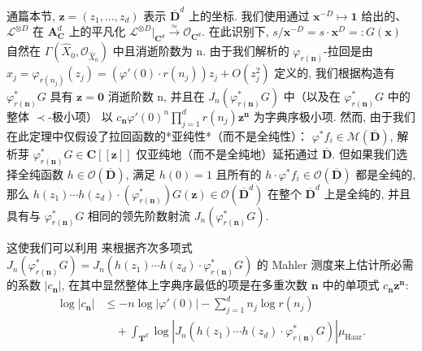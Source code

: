 通篇本节, \(\mathbf{z} = (z_1, \dots, z_d)\) 表示 \(\overline{\mathbf{D}}^d\) 上的坐标. 
我们使用通过 \(\mathbf{x}^{-D} \mapsto \mathbf{1}\) 给出的、\(\mathcal{L}^{\otimes D}\) 在 \(\mathbf{A}^d_{\mathbf{C}}\) 
上的平凡化 \(\mathcal{L}^{\otimes D}|_{\mathbf{C}^d} \stackrel{\simeq}{\to} \mathcal{O}_{\mathbf{C}^d}\). 
在此识别下, \(s/\mathbf{x}^{-D} = s \cdot \mathbf{x}^D =: G(\mathbf{x})\) 
自然在 \(\Gamma(\widehat{X}_0, \mathcal{O}_{\widehat{X}_0})\) 中且消逝阶数为 n. 
由于我们解析的 \(\varphi_{r(\mathbf{n})}\)-拉回是由 \(x_j = \varphi_{r(n_j)}(z_j) = (\varphi'(0) \cdot r(n_j))z_j + O(z_j^2)\) 定义的, 
我们根据构造有 \(\varphi^*_{r(\mathbf{n})}G\) 具有 \(\mathbf{z} = \mathbf{0}\) 消逝阶数 n, 
并且在 \(J_n\left(\varphi_{r(\mathbf{n})}^*G\right)\) 
中（以及在 \(\varphi_{r(\mathbf{n})}^*G\) 中的整体 \(\prec\)-极小项） 
以 \(c_{\mathbf{n}}\varphi'(0)^n \prod_{j=1}^d r(n_j) \mathbf{z}^{\mathbf{n}}\) 
为字典序极小项. 
然而, 由于我们在此定理中仅假设了拉回函数的*亚纯性*（而不是全纯性）： \(\varphi^*f_i \in \mathcal{M}(\overline{\mathbf{D}})\), 
解析芽 \(\varphi_{r(\mathbf{n})}^*G \in \mathbf{C}[\![\mathbf{z}]\!]\) 
仅亚纯地（而不是全纯地）延拓通过 \(\overline{\mathbf{D}}\). 
但如果我们选择全纯函数 \(h \in \mathcal{O}(\overline{\mathbf{D}})\), 
满足 \(h(0) = 1\) 且所有的 \(h \cdot \varphi^*f_i \in \mathcal{O}(\overline{\mathbf{D}})\) 都是全纯的, 
那么 \(h(z_1) \cdots h(z_d) \cdot \left(\varphi_{r(\mathbf{n})}^*\right) G(\mathbf{z}) \in \mathcal{O}\left(\overline{\mathbf{D}}^d\right)\) 
在整个 \(\overline{\mathbf{D}}^d\) 上是全纯的, 
并且具有与 \(\varphi_{r(\mathbf{n})}^*G\) 相同的领先阶数射流 \(J_n\left(\varphi_{r(\mathbf{n})}^*G\right)\).

这使我们可以利用 \cite[引理 2.4.1]{CDT21} 来根据齐次多项式 \(J_n\left(\varphi_{r(\mathbf{n})}^*G\right) = J_n\left(h(z_1)\cdots h(z_d)\cdot \varphi_{r(\mathbf{n})}^*G\right)\) 
的 Mahler 测度来上估计所必需的系数 \(|c_{\mathbf{n}}|\), 
在其中显然整体上字典序最低的项是在多重次数 \(\mathbf{n}\) 中的单项式 \(c_{\mathbf{n}}\mathbf{z}^{\mathbf{n}}\):
\begin{equation}\label{eq:8.2.13}
\begin{aligned}
\log |c_{\mathbf{n}}| &\leq -n \log |\varphi'(0)| - \sum_{j=1}^{d} n_{j} \log r(n_{j}) \\
&\quad + \int_{\mathbf{T}^{d}} \log \left| J_{n} \left( h(z_{1}) \cdots h(z_{d}) \cdot \varphi_{r(\mathbf{n})}^{*} G \right) \right| \mu_{\text{Haar}}.
\end{aligned}
\end{equation}

